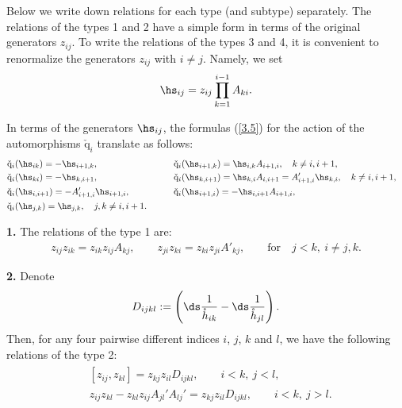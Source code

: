 \documentclass[11pt]{article}
\def\nplus{\mathfrak{n}}\def\nn{\nonumber}\def\nin{\noindent}
\def\q{\check{\mathrm q}}\def\Q{\mathrm{Q}}\def\r#1{(\ref{#1})}\let\rf=\r
\def\s{z}\def\S{\mathrm {S}}\def\si{\sigma}\def\Sp{\S^{\nplus}}\def\sy{\acute{\sigma}}\def\th{\mathring{h}}
\def\tphi{A}\def\tpsi{A'}\def\tphiplus{B}\def\tpsiminus{B'}\def\ttphi{B}\def\ttpsi{B'}\def\ts{\hskip1pt}\def\tts{\hskip.5pt}
\numberwithin{equation}{section}
\begin{document}
Below we write down relations for each type (and subtype) separately. The relations of the types 1 and 2 have a simple form in terms of the original
generators $\s_{ij}$. To write the relations  of the types 3 and 4, it is convenient to renormalize the generators $\s_{ij}$
with $i\not=j$. Namely, we set
\begin{gather}
\label{not8}\hs_{ij}=\s_{ij}\prod_{k=1}^{i-1}\tphi_{ki}  .
\end{gather}

In terms of the generators $\hs_{ij}$, the formulas \rf{3.5} for the action of the automorphisms $\q_i$  translate as follows:
\begin{alignat*}{3}
& \q_{i}(\hs_{ik})=-\hs_{i+1,k} ,\qquad &&  \q_{i}(\hs_{i+1,k})=\hs_{i,k}\tphi_{i+1,i} ,\quad k\not=i,i+1 , & \\
&\q_{i}(\hs_{ki})=-\hs_{k,i+1} ,\qquad && \q_{i}(\hs_{k,i+1})=\hs_{k,i}\tphi_{i,i+1}=\tpsi_{i+1,i}\hs_{k,i} ,\quad k\not=i,i+1,&
\\
&\q_{i}(\hs_{i,i+1})=-\tpsi_{i+1,i}\hs_{i+1,i} , \qquad &&\q_{i}(\hs_{i+1,i})=-\hs_{i,i+1}\tphi_{i+1,i} ,& \\
 &\q_{i}(\hs_{j,k})=\hs_{j,k} , \quad j,k\neq i,i+1 .\qquad &&&
 \end{alignat*}

{\bf 1.} The relations of  the type 1 are:
\begin{gather}\label{relation1}
\s_{ij}\s_{ik}=\s_{ik}\s_{ij}\tphi_{kj} ,\qquad
\s_{ji}\s_{ki}=\s_{ki}\s_{ji}\tpsi_{kj} ,\qquad \text{for}\quad j<k ,\  i\not=j,k .
\end{gather}

{\bf 2.} Denote
\begin{gather*}
D_{ijkl}:=\left( {\ds\frac{1}{\th_{ik}}}-{\ds\frac{1}{\th_{jl}}}\right).
\end{gather*}
Then, for any four pairwise dif\/ferent indices $i$, $j$, $k$ and $l$, we have the following relations of the type 2:
\begin{gather}
\begin{split}
& [ \s_{ij},\s_{kl} ]=\s_{kj}\s_{il}D_{ijkl} , \qquad i<k ,\ j<l  , \\ %
& \s_{ij}\s_{kl}-\s_{kl}\s_{ij}\tphi_{jl}'\tphi_{lj}'=\s_{kj}\s_{il}
D_{ijkl} ,\qquad i<k ,\ j>l.
\end{split} \label{relation2}
\end{gather}
\end{document}
